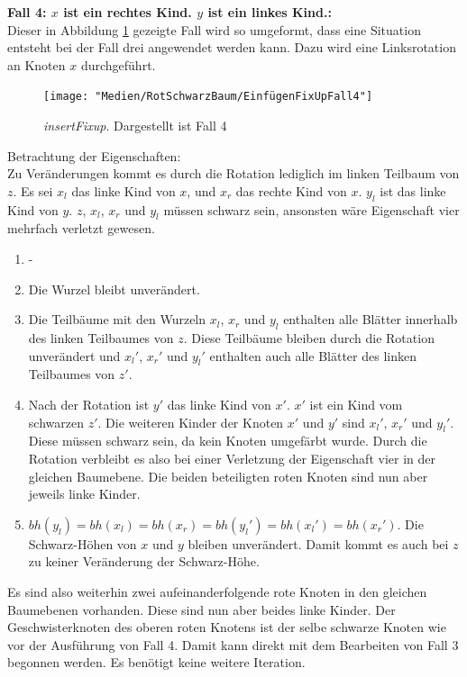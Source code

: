 \documentclass[a4paper,12pt]{article}
\begin{document}
\noindent\textbf{Fall 4: $x$ ist ein rechtes Kind. $y$ ist ein linkes Kind.: }\\      
Dieser in Abbildung \ref{fig:EinfügenFixUpFall4} gezeigte Fall wird so umgeformt, dass eine Situation entsteht bei der Fall drei angewendet werden kann. Dazu wird eine Linksrotation an Knoten $x$ durchgeführt.\\
\begin{figure}[H]
	\centering
	\texttt{[image: "Medien/RotSchwarzBaum/EinfügenFixUpFall4"]}
	\caption{\textit{insertFixup}. Dargestellt ist Fall 4  }
	\label{fig:EinfügenFixUpFall4}
\end{figure}
\noindent Betrachtung der Eigenschaften:\\
Zu Veränderungen kommt es durch die Rotation lediglich im linken Teilbaum von $z$. Es sei $x_l$ das linke Kind von $x$,  und $x_r$ das rechte Kind von $x$. $y_l$ ist das linke Kind von $y$. $z$, $x_l$, $x_r$ und $y_l$ müssen schwarz sein, ansonsten wäre Eigenschaft vier mehrfach verletzt gewesen.
\begin{enumerate}
	\item -
	\item Die Wurzel bleibt unverändert.
	\item  Die Teilbäume mit den Wurzeln $x_l$, $x_r$ und $y_l$ enthalten alle Blätter innerhalb des linken Teilbaumes von $z$. Diese Teilbäume bleiben durch die Rotation unverändert und ${x_l}'$, ${x_r}'$ und ${y_l}'$ enthalten auch alle Blätter des linken Teilbaumes von $z'$.
	\item Nach der Rotation ist $y'$ das linke Kind von $x'$. $x'$ ist ein Kind vom schwarzen $z'$. Die weiteren Kinder der Knoten $x'$ und $y'$ sind ${x_l}'$, ${x_r}'$ und ${y_l}'$. Diese müssen schwarz sein, da kein Knoten umgefärbt wurde. Durch die Rotation verbleibt es also bei einer Verletzung der Eigenschaft vier in der gleichen Baumebene. Die beiden beteiligten roten Knoten sind nun aber jeweils linke Kinder.   
	\item $ \mathit{bh(y_l)} = \mathit{bh(x_l)} = \mathit{bh(x_r)} = \mathit{bh({y_l}')} = \mathit{bh({x_l}')} = \mathit{bh({x_r}')} $. Die Schwarz-Höhen von $x$ und $y$ bleiben unverändert. Damit kommt es auch bei $z$ zu keiner Veränderung der Schwarz-Höhe. 
\end{enumerate}  

\noindent Es sind also weiterhin zwei aufeinanderfolgende rote Knoten in den gleichen Baumebenen vorhanden. Diese sind nun aber beides linke Kinder. Der Geschwisterknoten des oberen roten Knotens ist der selbe schwarze Knoten wie vor der Ausführung von Fall 4. Damit kann direkt mit dem Bearbeiten von Fall 3 begonnen werden. Es benötigt keine weitere Iteration.\\
\end{document}
